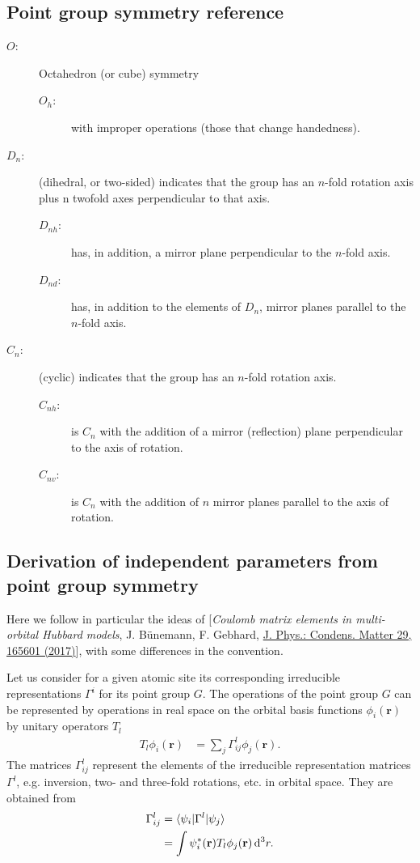 \documentclass[12pt,a4paper]{scrartcl}
\numberwithin{equation}{section}
\renewcommand{\vec}{\mathbf}
\begin{document}
\subsection{Point group symmetry reference}
\begin{description}
 \item[$O$:] Octahedron (or cube) symmetry
 \begin{description}
  \item[$O_h$:] with improper operations (those that change handedness).
 \end{description}
%
 \item[$D_n$:]  (dihedral, or two-sided) indicates that the group has an $n$-fold rotation axis plus n twofold axes perpendicular to that axis. 
 \begin{description}
  \item[$D_{nh}$:] has, in addition, a mirror plane perpendicular to the $n$-fold axis. 
  \item[$D_{nd}$:] has, in addition to the elements of $D_n$, mirror planes parallel to the $n$-fold axis.
 \end{description}
%
 \item[$C_n$:] (cyclic) indicates that the group has an $n$-fold rotation axis. 
 \begin{description}
   \item[$C_{nh}$:] is $C_n$ with the addition of a mirror (reflection) plane perpendicular to the axis of rotation. 
   \item[$C_{nv}$:] is $C_n$ with the addition of $n$ mirror planes parallel to the axis of rotation.
 \end{description} 
\end{description}

\subsection{Derivation of independent parameters from point group symmetry}
Here we follow in particular the ideas of [\textit{Coulomb matrix elements in multi-orbital Hubbard models}, J. B\"unemann, F. Gebhard, \href{https://doi.org/10.1088/1361-648X/aa5900}{J. Phys.: Condens. Matter 29, 165601 (2017)}], with some differences in the convention.

Let us consider for a given atomic site its corresponding irreducible representations $\Gamma^i$
for its point group $G$. The operations of the point group $G$ can be represented by 
operations in real space on the orbital basis functions $\phi_i(\vec{r})$ by unitary operators
$T_l$
\begin{align}
 T_l \phi_i(\vec{r}) &= \sum_j \Gamma^l_{ij} \phi_j(\vec{r}).
\end{align}
The matrices $\Gamma^l_{ij}$ represent the elements of the irreducible representation matrices $\Gamma^l$,
e.g. inversion, two- and three-fold rotations, etc. in orbital space. 
They are obtained from
\begin{align}
 \Gamma^l_{ij}
 &= \braket{\psi_i | \Gamma^l | \psi_j} \\
 &= \int \psi^*_i(\vec{r}) T_l \phi_j(\vec{r}) \, \mathrm{d}^3r.
\end{align}
\end{document}
